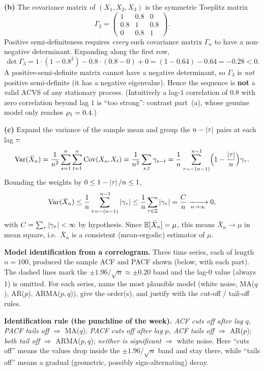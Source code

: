 \documentclass[11pt]{article}
\begin{document}
\textbf{(b)} The covariance matrix of $(X_1,X_2,X_3)$ is the symmetric Toeplitz matrix
\[
\Gamma_3=\begin{pmatrix}1&0.8&0\\[2pt] 0.8&1&0.8\\[2pt] 0&0.8&1\end{pmatrix}.
\]
Positive semi-definiteness requires \emph{every} such covariance matrix $\Gamma_n$ to have a non-negative determinant. Expanding along the first row,
\[
\det\Gamma_3=1\cdot(1-0.8^2)-0.8\cdot(0.8-0)+0=(1-0.64)-0.64=-0.28<0 .
\]
A positive-semi-definite matrix cannot have a negative determinant, so $\Gamma_3$ is \emph{not} positive semi-definite (it has a negative eigenvalue). Hence the sequence is \textbf{not} a valid ACVS of any stationary process. (Intuitively a lag-$1$ correlation of $0.8$ with zero correlation beyond lag $1$ is ``too strong'': contrast part~(a), whose genuine model only reaches $\rho_1=0.4$.)

\textbf{(c)} Expand the variance of the sample mean and group the $n-\left\lvert \tau \right\rvert$ pairs at each lag $\tau$:
\[
\operatorname{Var}(\bar X_n)=\frac1{n^2}\sum_{s=1}^n\sum_{t=1}^n\operatorname{Cov}(X_s,X_t)=\frac1{n^2}\sum_{s,t}\gamma_{s-t}
=\frac1n\sum_{\tau=-(n-1)}^{\,n-1}\Bigl(1-\frac{\left\lvert \tau \right\rvert}{n}\Bigr)\gamma_\tau .
\]
Bounding the weights by $0\le 1-\left\lvert \tau \right\rvert/n\le1$,
\[
\operatorname{Var}(\bar X_n)\le\frac1n\sum_{\tau=-(n-1)}^{\,n-1}\left\lvert \gamma_\tau \right\rvert\le\frac1n\sum_{\tau\in\mathbb{Z}}\left\lvert \gamma_\tau \right\rvert=\frac{C}{n}\xrightarrow[n\to\infty]{}0,
\]
with $C=\sum_\tau\left\lvert \gamma_\tau \right\rvert<\infty$ by hypothesis. Since $\mathbb{E}[\bar X_n]=\mu$, this means $\bar X_n\to\mu$ in mean square, i.e.\ $\bar X_n$ is a consistent (mean-ergodic) estimator of $\mu$.

\statementstart
\textbf{Model identification from a correlogram.} Three time series, each of length $n=100$, produced the sample ACF and PACF shown (below, with each part). The dashed lines mark the $\pm1.96/\sqrt n\approx\pm0.20$ band and the lag-$0$ value (always $1$) is omitted. For each series, name the most plausible model (white noise, MA($q$), AR($p$), ARMA($p,q$)), give the order(s), and justify with the cut-off / tail-off rules.
\statementend

\textbf{Identification rule (the punchline of the week).} \emph{ACF cuts off after lag $q$, PACF tails off} $\Rightarrow$ MA($q$); \emph{PACF cuts off after lag $p$, ACF tails off} $\Rightarrow$ AR($p$); \emph{both tail off} $\Rightarrow$ ARMA($p,q$); \emph{neither is significant} $\Rightarrow$ white noise. Here ``cuts off'' means the values drop inside the $\pm1.96/\sqrt n$ band and stay there, while ``tails off'' means a gradual (geometric, possibly sign-alternating) decay.
\end{document}
